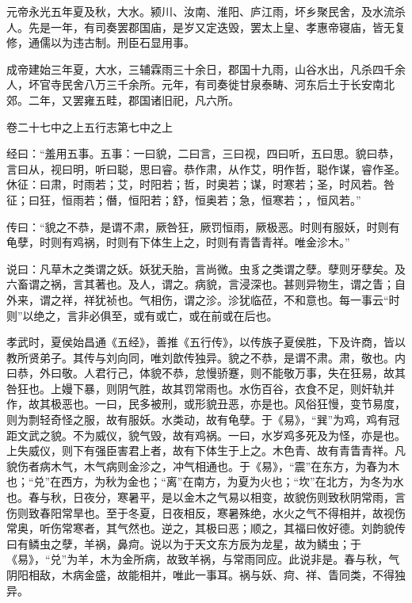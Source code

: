 \documentclass[12pt,UTF8]{ctexbook}
\begin{document}
元帝永光五年夏及秋，大水。颍川、汝南、淮阳、庐江雨，坏乡聚民舍，及水流杀人。先是一年，有司奏罢郡国庙，是岁又定迭毁，罢太上皇、孝惠帝寝庙，皆无复修，通儒以为违古制。刑臣石显用事。



成帝建始三年夏，大水，三辅霖雨三十余日，郡国十九雨，山谷水出，凡杀四千余人，坏官寺民舍八万三千余所。元年，有司奏徙甘泉泰畴、河东后土于长安南北郊。二年，又罢雍五畦，郡国诸旧祀，凡六所。





卷二十七中之上五行志第七中之上



经曰：“羞用五事。五事：一曰貌，二曰言，三曰视，四曰听，五曰思。貌曰恭，言曰从，视曰明，听曰聪，思曰睿。恭作肃，从作艾，明作哲，聪作谋，睿作圣。休征：曰肃，时雨若；艾，时阳若；哲，时奥若；谋，时寒若；圣，时风若。咎征；曰狂，恒雨若；僭，恒阳若；舒，恒奥若；急，恒寒若；，恒风若。”



传曰：“貌之不恭，是谓不肃，厥咎狂，厥罚恒雨，厥极恶。时则有服妖，时则有龟孽，时则有鸡祸，时则有下体生上之，时则有青眚青祥。唯金沴木。”



说曰：凡草木之类谓之妖。妖犹夭胎，言尚微。虫豸之类谓之孽。孽则牙孽矣。及六畜谓之祸，言其著也。及人，谓之。病貌，言浸深也。甚则异物生，谓之眚；自外来，谓之祥，祥犹祯也。气相伤，谓之沴。沴犹临莅，不和意也。每一事云“时则”以绝之，言非必俱至，或有或亡，或在前或在后也。



孝武时，夏侯始昌通《五经》，善推《五行传》，以传族子夏侯胜，下及许商，皆以教所贤弟子。其传与刘向同，唯刘歆传独异。貌之不恭，是谓不肃。肃，敬也。内曰恭，外曰敬。人君行己，体貌不恭，怠慢骄蹇，则不能敬万事，失在狂易，故其咎狂也。上嫚下暴，则阴气胜，故其罚常雨也。水伤百谷，衣食不足，则奸轨并作，故其极恶也。一曰，民多被刑，或形貌丑恶，亦是也。风俗狂慢，变节易度，则为剽轻奇怪之服，故有服妖。水类动，故有龟孽。于《易》，“巽”为鸡，鸡有冠距文武之貌。不为威仪，貌气毁，故有鸡祸。一曰，水岁鸡多死及为怪，亦是也。上失威仪，则下有强臣害君上者，故有下体生于上之。木色青、故有青眚青祥。凡貌伤者病木气，木气病则金沴之，冲气相通也。于《易》，“震”在东方，为春为木也；“兑”在西方，为秋为金也；“离”在南方，为夏为火也；“坎”在北方，为冬为水也。春与秋，日夜分，寒暑平，是以金木之气易以相变，故貌伤则致秋阴常雨，言伤则致春阳常旱也。至于冬夏，日夜相反，寒暑殊绝，水火之气不得相并，故视伤常奥，听伤常寒者，其气然也。逆之，其极曰恶；顺之，其福曰攸好德。刘韵貌传曰有鳞虫之孽，羊祸，鼻疴。说以为于天文东方辰为龙星，故为鳞虫；于《易》，“兑”为羊，木为金所病，故致羊祸，与常雨同应。此说非是。春与秋，气阴阳相敌，木病金盛，故能相并，唯此一事耳。祸与妖、疴、祥、眚同类，不得独异。
\end{document}
